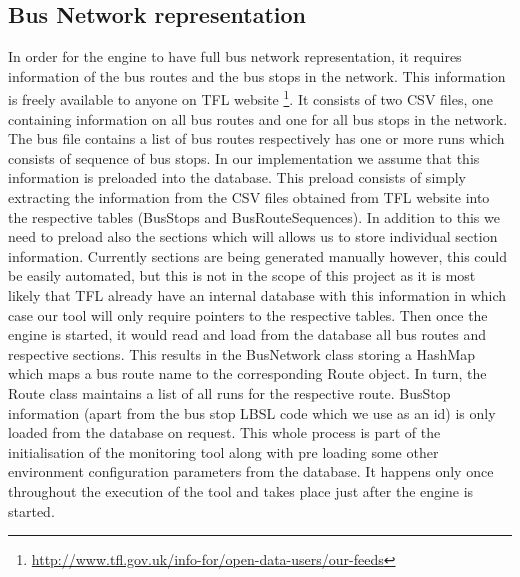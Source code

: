\FloatBarrier
\subsection{Bus Network representation}
In order for the engine to have full bus network representation, it requires information of the bus routes and the bus stops in the network. This information is freely available to anyone on TFL website \footnote{\url{http://www.tfl.gov.uk/info-for/open-data-users/our-feeds}}. It consists of two CSV files, one containing information on all bus routes and one for all bus stops in the network. The bus file contains a list of bus routes respectively has one or more runs which consists of sequence of bus stops. In our implementation we assume that this information is preloaded into the database. This preload consists of simply extracting the information from the CSV files obtained from TFL website into the respective tables (BusStops and BusRouteSequences). In addition to this we need to preload also the sections which will allows us to store individual section information. Currently sections are being generated manually however, this could be easily automated, but this is not in the scope of this project as it is most likely that TFL already have an internal database with this information in which case our tool will only require pointers to the respective tables. Then once the engine is started, it would read and load from the database all bus routes and respective sections. This results in the BusNetwork class storing a HashMap which maps a bus route name to the corresponding Route object. In turn, the Route class maintains a list of all runs for the respective route. BusStop information (apart from the bus stop LBSL code which we use as an id) is only loaded from the database on request. This whole process is part of the initialisation of the monitoring tool along with pre loading some other environment configuration parameters from the database. It happens only once throughout the execution of the tool and takes place just after the engine is started.

